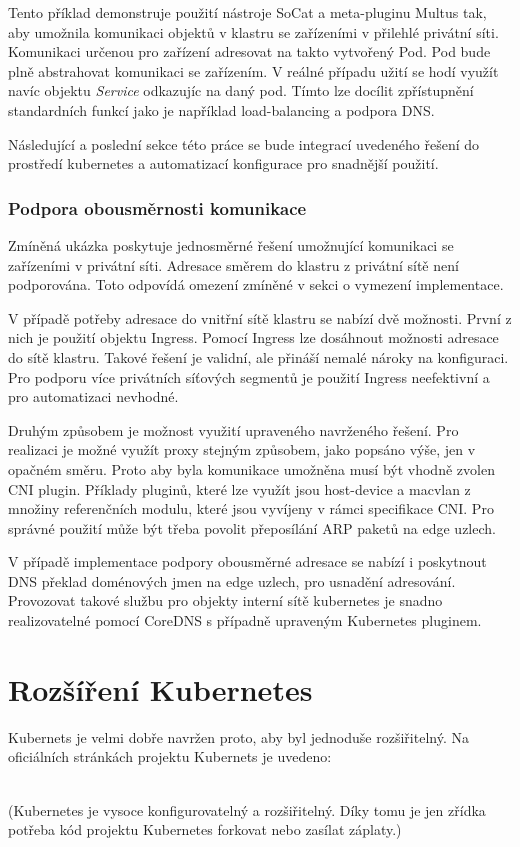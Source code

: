 \bigskip
Tento příklad demonstruje použití nástroje SoCat a meta-pluginu Multus tak, aby umožnila komunikaci objektů v klastru se zařízeními v přilehlé privátní síti. Komunikaci určenou pro zařízení adresovat na takto vytvořený Pod. Pod bude plně abstrahovat komunikaci se zařízením. V reálné případu užití se hodí využít navíc objektu \textit{Service} odkazujíc na daný pod. Tímto lze docílit zpřístupnění standardních funkcí jako je například load-balancing a podpora DNS.

Následující a poslední sekce této práce se bude integrací uvedeného řešení do prostředí kubernetes a automatizací konfigurace pro snadnější použití.  

\subsubsection*{Podpora obousměrnosti komunikace}
Zmíněná ukázka poskytuje jednosměrné řešení umožnující komunikaci se zařízeními v privátní síti. Adresace směrem do klastru z privátní sítě není podporována. Toto odpovídá omezení zmíněné v sekci o vymezení implementace.

V případě potřeby adresace do vnitřní sítě klastru se nabízí dvě možnosti. První z nich je použití objektu Ingress. Pomocí Ingress lze dosáhnout možnosti adresace do sítě klastru. Takové řešení je validní, ale přináší nemalé nároky na konfiguraci. Pro podporu více privátních síťových segmentů je použití Ingress neefektivní a pro automatizaci nevhodné.

Druhým způsobem je možnost využití upraveného navrženého řešení. Pro realizaci je možné využít proxy stejným způsobem, jako popsáno výše, jen v opačném směru. Proto aby byla komunikace umožněna musí být vhodně zvolen  CNI plugin. Příklady pluginů, které lze využít jsou host-device a macvlan z množiny referenčních modulu, které jsou vyvíjeny v rámci specifikace CNI. Pro správné použití může být třeba povolit přeposílání ARP paketů na edge uzlech.

V případě implementace podpory obousměrné adresace se nabízí i poskytnout DNS překlad doménových jmen na edge uzlech, pro usnadění adresování. Provozovat takové službu pro objekty interní sítě kubernetes je snadno realizovatelné pomocí CoreDNS s případně upraveným Kubernetes pluginem.  

\section{Rozšíření Kubernetes}\label{sec:extend}
Kubernets je velmi dobře navržen proto, aby byl jednoduše rozšiřitelný. Na oficiálních stránkách projektu Kubernets je uvedeno: 
\begin{displayquote}
\\(Kubernetes je vysoce konfigurovatelný a rozšiřitelný. Díky tomu je jen zřídka potřeba kód projektu Kubernetes forkovat nebo zasílat záplaty.)\cite{thekubernetesauthors_2022_kubernetes}
\end{displayquote}

